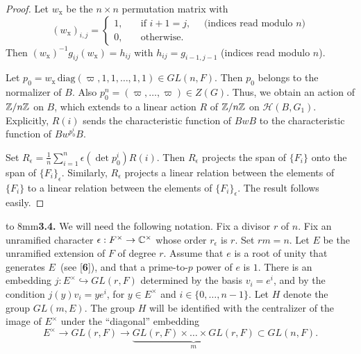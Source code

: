 \documentclass{amsart}
\begin{document}
\begin{proof}
Let 
  $ w_{\text{x}} $
be the
  $ n \times n $
permutation matrix with
%
$$
  (w_{\text{x}})_{i, j} =
  \begin{cases}
    1, \quad &\text{if } i + 1 = j, \quad \text{ (indices read modulo $n$)} \\
    0, &\text{otherwise}.
  \end{cases}
$$
%
Then
  $ (w_{\text{x}})^{-1} g_{ij} (w_{\text{x}}) =
     h_{ij} $
with
  $ h_{ij} = g_{i-1, j-1} $
(indices read modulo $n$).

Let
  $ p_0 =
    w_{\text{x}} \,
    \text{diag}
    (\varpi,1, 1, \dots , 1, 1)
    \in GL(n,F) $.
    Then $p_0$ belongs to the normalizer of $B$.
Also
  $ p_0^n =
    (\varpi, \dots , \varpi) 
    \in Z (G) $.
Thus, we obtain an action of
  $ {\Bbb Z} / n {\Bbb Z} $
on $B$, which extends to a linear action $R$ of
  $ {\Bbb Z} / n {\Bbb Z} $
on
  $ {\mathcal H} (B, G_1) $.
Explicitly, $R(i)$ sends the characteristic
function of $BwB$ to the characteristic function of
  ${B w^{p_0^i} B} $.

Set
  $ R_{\epsilon} =
    \frac1n\sum_{i = 1}^n 
    \epsilon (\det p_0^i) R(i) $.
Then $R_\epsilon$ projects the span of $\{F_i\}$ onto the
span of $\{F_i\}_\epsilon$.  Similarly, $R_\epsilon$ projects
a linear relation between the elements of $\{F_i\}$ to a linear relation
between the elements of $\{F_i\}_\epsilon$.  The result
follows easily.
\end{proof}

\bigskip
\noindent
\hbox to 8mm{{\bf 3.4.}\hfil} 
We will need the following notation.
Fix a divisor $r$ of $n$.  Fix an unramified character $\epsilon:F^\times\to{\Bbb C}^\times$
whose order $r_\epsilon$ is $r$. 
Set $ rm = n $.
Let $E$ be the unramified extension of $F$ of degree $r$.
Assume that $e$ is a root of unity that generates $E$\ (see [{\bf 6}]),
and that a prime-to-$p$ power of $e$ is $1$.  There is
an embedding
  $ j : E^{\times} \hookrightarrow GL(r,F) $
determined by the basis
  $ v_i = e^i $, 
and by the condition
  $ j(y) v_i = y e^i$, for $y \in E^{\times}$
  and $ i \in\{ 0, \dots , n-1\}$.
Let $H$ denote the group $GL(m,E)$.  The group $H$ will
be identified with the centralizer of the image of $E^\times$
under the ``diagonal'' embedding
\[
E^\times \longrightarrow GL(r,F)  \longrightarrow
     \underbrace{GL(r,F)\times\dots\times GL(r,F)}_{m}\subset GL(n,F).
\]
\end{document}
